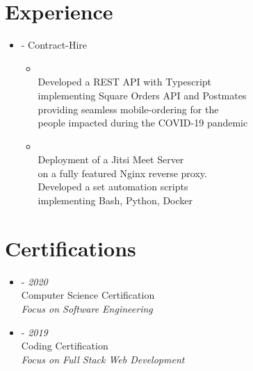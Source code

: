 \documentclass[11pt,oneside,a4paper,titlepage]{article}
\begin{document}
\begin{tcolorbox}
\begin{minipage}[t]{10cm}
\begin{tcolorbox}[grow to right by=1cm,colframe=white,colback=white]
      \vspace{-0.6cm}
      \section*{Experience}
      \vspace{-0.2cm}
      \begin{itemize}[label={}]
        \item{{} - Contract-Hire
          \begin{itemize}[leftmargin=-0cm]
            \vspace{-0.20cm}
              \item{\emph{}\\
                {Developed a {{REST API}} with {{Typescript}}}\\
                {implementing {{Square Orders API}} and {{Postmates}}}\\
                {providing seamless mobile-ordering for the}\\
                {people impacted during the COVID-19 pandemic}}
              \item{\emph{}\\
                {Deployment of a {Jitsi Meet} Server}\\
                {on a fully featured {Nginx} reverse proxy}.\\
                {Developed a set automation scripts}\\
                {implementing {Bash}, {Python}, {Docker}}}
          \end{itemize}}
      \end{itemize}
      \vspace{-0.6cm}
      \section*{Certifications}
      \vspace{-0.2cm}
      \begin{itemize}[]
        \item{
            {{} - \footnotesize{\emph{2020}}}\\
            Computer Science Certification\\
            \emph{Focus on Software Engineering}
          }
        \item{
            {{} - \footnotesize{\emph{2019}}}\\
            {Coding Certification}\\
            \emph{Focus on Full Stack Web Development}
          }
      \end{itemize}


\end{tcolorbox}
\end{minipage}
\end{tcolorbox}
\end{document}
